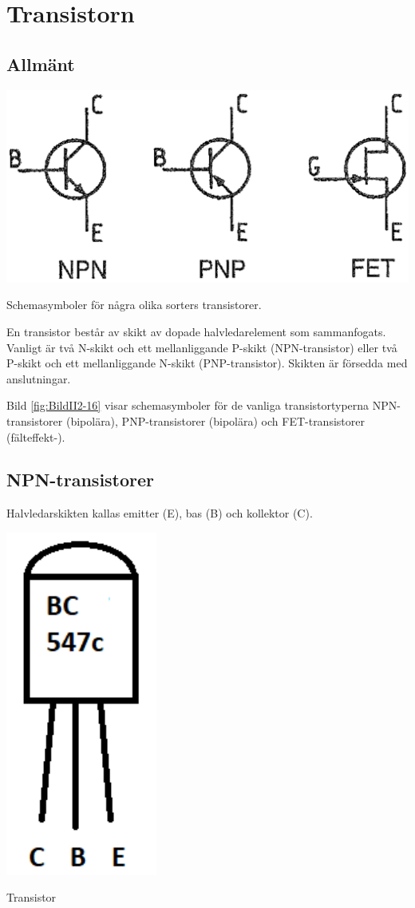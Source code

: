 \section{Transistorn}
\label{transistorn}

\subsection{Allmänt}

\begin{marginfigure}
\includegraphics[width=\textwidth]{images/cropped_pdfs/bild_2_2-16.pdf}
\caption{Schemasymboler för några olika sorters transistorer.}
\label{fig:BildII2-16}
\end{marginfigure}

En transistor består av skikt av dopade halvledarelement som
sammanfogats. Vanligt är två N-skikt och ett mellanliggande P-skikt
(NPN-transistor) eller två P-skikt och ett mellanliggande N-skikt
(PNP-transistor). Skikten är försedda med anslutningar.

Bild \ref{fig:BildII2-16} visar schemasymboler för de vanliga
transistortyperna NPN-transistorer (bipolära), PNP-transistorer
(bipolära) och FET-transistorer (fälteffekt-).

\subsection{NPN-transistorer}

Halvledarskikten kallas emitter (E), bas (B) och kollektor (C).

\begin{marginfigure}
\includegraphics[width=.15\textwidth]{images/cropped_pdfs/bild_2_6-37.pdf}
\caption{Transistor}
\label{fig:BildII2-17a}
\end{marginfigure}

